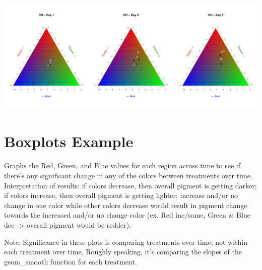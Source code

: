 \documentclass[
]{article}
\newenvironment{Shaded}{\begin{snugshade}}{\end{snugshade}}
\newcommand{\AttributeTok}[1]{\textcolor[rgb]{0.13,0.29,0.53}{#1}}
\newcommand{\ControlFlowTok}[1]{\textcolor[rgb]{0.13,0.29,0.53}{\textbf{#1}}}
\newcommand{\DecValTok}[1]{\textcolor[rgb]{0.00,0.00,0.81}{#1}}
\newcommand{\FloatTok}[1]{\textcolor[rgb]{0.00,0.00,0.81}{#1}}
\newcommand{\FunctionTok}[1]{\textcolor[rgb]{0.13,0.29,0.53}{\textbf{#1}}}
\newcommand{\NormalTok}[1]{#1}
\newcommand{\OtherTok}[1]{\textcolor[rgb]{0.56,0.35,0.01}{#1}}
\newcommand{\SpecialCharTok}[1]{\textcolor[rgb]{0.81,0.36,0.00}{\textbf{#1}}}
\newcommand{\StringTok}[1]{\textcolor[rgb]{0.31,0.60,0.02}{#1}}
\begin{document}
\begin{Shaded}
\end{Shaded}

\includegraphics{color_analysis_pdf_files/figure-latex/Ternary w/ Ternary Package-1.pdf}

\section{Boxplots Example}\label{boxplots-example}

Graphs the Red, Green, and Blue values for each region across time to
see if there's any significant change in any of the colors between
treatments over time. Interpretation of results: if colors decrease,
then overall pigment is getting darker; if colors increase, then overall
pigment is getting lighter; increase and/or no change in one color while
other colors decrease would result in pigment change towards the
increased and/or no change color (ex. Red inc/same, Green \& Blue dec
-\textgreater{} overall pigment would be redder).

Note: Significance in these plots is comparing treatments over time, not
within each treatment over time. Roughly speaking, it's comparing the
slopes of the geom\_smooth function for each treatment.
\end{document}
